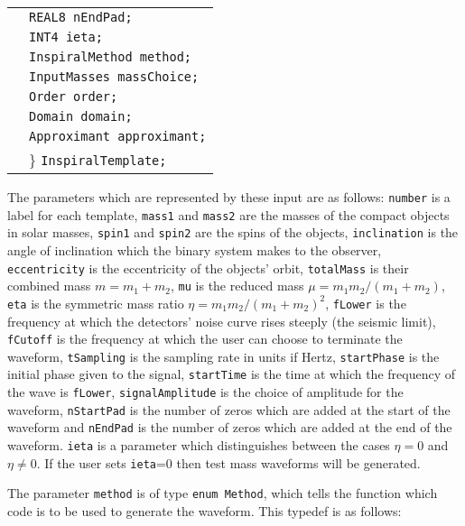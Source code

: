 \documentclass[12pt]{article}
\begin{document}
\begin{tabular}{ll}
                        & \texttt{REAL8 nEndPad;} \\
                        & \texttt{INT4 ieta;} \\
                        & \texttt{InspiralMethod method;}  \\
                        & \texttt{InputMasses massChoice;}  \\
                        & \texttt{Order order;}  \\
                        & \texttt{Domain domain;}  \\
                        & \texttt{Approximant approximant;}  \\
                        & \} \texttt{InspiralTemplate;}
\end{tabular}

\vspace{5mm}




The parameters which are represented by these input are as follows: \texttt{number} is a label for each template, \texttt{mass1} and \texttt{mass2} are the masses of the compact objects in solar masses, \texttt{spin1} and \texttt{spin2} are the spins of the objects, \texttt{inclination} is the angle of inclination which the binary system makes to the observer, \texttt{eccentricity} is the eccentricity of the objects' orbit, \texttt{totalMass} is their combined mass $m=m_{1}+m_{2}$, \texttt{mu} is the reduced mass $\mu=m_{1}m_{2}/(m_{1}+m_{2})$, \texttt{eta} is the symmetric mass ratio $\eta=m_{1}m_{2}/(m_{1}+m_{2})^{2}$, \texttt{fLower} is the frequency at which the detectors' noise curve rises steeply (the seismic limit), \texttt{fCutoff} is the frequency at which the user can choose to terminate the waveform, \texttt{tSampling} is the sampling rate in units if Hertz, \texttt{startPhase} is the initial phase given to the signal, \texttt{startTime} is the time at which the frequency of the wave is \texttt{fLower},  \texttt{signalAmplitude} is the choice of amplitude for the waveform, \texttt{nStartPad} is the number of zeros which are added at the start of the waveform and \texttt{nEndPad} is the number of zeros which are added at the end of the waveform. \texttt{ieta} is a parameter which distinguishes between the cases $\eta=0$ and $\eta \neq 0$. If the user sets \texttt{ieta}=0 then test mass waveforms will be generated.

The parameter \texttt{method} is of type \texttt{enum Method}, which tells the function which code is to be used to generate the waveform. This typedef is as follows:
\end{document}
